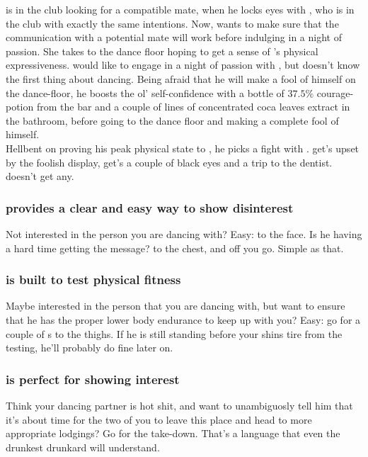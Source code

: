 \begin{scene*}
\dude is in the club looking for a compatible mate, when he locks eyes with , who is in the club with exactly the same intentions. Now,  wants to make sure that the communication with a potential mate will work before indulging in a night of passion. She takes to the dance floor hoping to get a sense of \dude's physical expressiveness. \dude would like to engage in a night of passion with , but doesn't know the first thing about dancing. Being afraid that he will make a fool of himself on the dance-floor, he boosts the ol' self-confidence with a bottle of $37.5\%$ courage-potion from the bar and a couple of lines of concentrated coca leaves extract in the bathroom, before going to the dance floor and making a complete fool of himself.\\
Hellbent on proving his peak physical state to , he picks a fight with \dudetwo.  get's upset by the foolish display, \dudetwo get's a couple of black eyes and a trip to the dentist. \dude doesn't get any.
\end{scene*}

\newpage

{}

\subsubsection*{\sovs provides a clear and easy way to show disinterest}
Not interested in the person you are dancing with? Easy: \attknytter to the face. Is he having a hard time getting the message? \atttrykker to the chest, and off you go. Simple as that.

\subsubsection*{\sovs is built to test physical fitness}
Maybe interested in the person that you are dancing with, but want to ensure that he has the proper lower body endurance to keep up with you? Easy: go for a couple of \attlosser$\!$s to the thighs. If he is still standing before your shins tire from the testing, he'll probably do fine later on.

\subsubsection*{\sovs is perfect for showing interest}
Think your dancing partner is hot shit, and want to unambiguosly tell him that it's about time for the two of you to leave this place and head to more appropriate lodgings? Go for the take-down. That's a language that even the drunkest drunkard will understand. 


